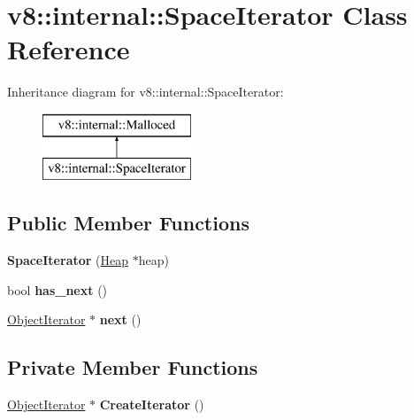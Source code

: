 \hypertarget{classv8_1_1internal_1_1_space_iterator}{}\section{v8\+:\+:internal\+:\+:Space\+Iterator Class Reference}
\label{classv8_1_1internal_1_1_space_iterator}
Inheritance diagram for v8\+:\+:internal\+:\+:Space\+Iterator\+:\begin{figure}[H]
\begin{center}
\leavevmode
\includegraphics[height=2.000000cm]{classv8_1_1internal_1_1_space_iterator}
\end{center}
\end{figure}
\subsection*{Public Member Functions}
\begin{DoxyCompactItemize}
\item 
{\bfseries Space\+Iterator} (\hyperlink{classv8_1_1internal_1_1_heap}{Heap} $\ast$heap)\hypertarget{classv8_1_1internal_1_1_space_iterator_af9a3044ca1651af702fdaf8f10c816d5}{}\label{classv8_1_1internal_1_1_space_iterator_af9a3044ca1651af702fdaf8f10c816d5}

\item 
bool {\bfseries has\+\_\+next} ()\hypertarget{classv8_1_1internal_1_1_space_iterator_ad580ae3fee14e8352e6de8ab9b7425da}{}\label{classv8_1_1internal_1_1_space_iterator_ad580ae3fee14e8352e6de8ab9b7425da}

\item 
\hyperlink{classv8_1_1internal_1_1_object_iterator}{Object\+Iterator} $\ast$ {\bfseries next} ()\hypertarget{classv8_1_1internal_1_1_space_iterator_a09b2c61000d188b65dc52b576cb63db7}{}\label{classv8_1_1internal_1_1_space_iterator_a09b2c61000d188b65dc52b576cb63db7}

\end{DoxyCompactItemize}
\subsection*{Private Member Functions}
\begin{DoxyCompactItemize}
\item 
\hyperlink{classv8_1_1internal_1_1_object_iterator}{Object\+Iterator} $\ast$ {\bfseries Create\+Iterator} ()\hypertarget{classv8_1_1internal_1_1_space_iterator_a5d3e776a9f9ad4e30bb8c19f0aee28ca}{}\label{classv8_1_1internal_1_1_space_iterator_a5d3e776a9f9ad4e30bb8c19f0aee28ca}

\end{DoxyCompactItemize}
